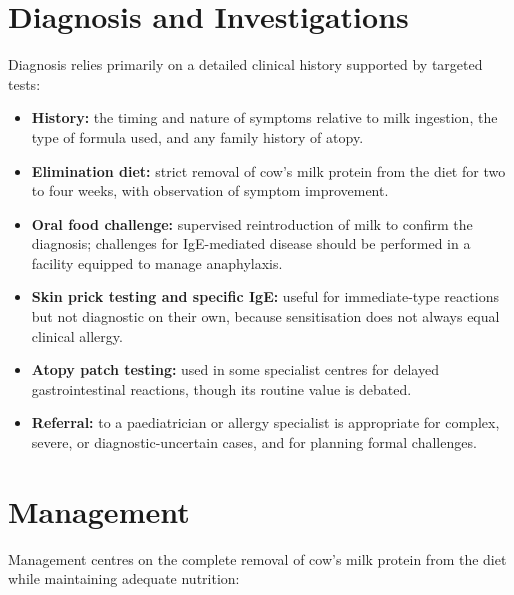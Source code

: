 \section*{Diagnosis and Investigations}
Diagnosis relies primarily on a detailed clinical history supported by targeted tests:

\begin{itemize}
    \item \textbf{History:} the timing and nature of symptoms relative to milk ingestion, the type of formula used, and any family history of atopy.
    \item \textbf{Elimination diet:} strict removal of cow's milk protein from the diet for two to four weeks, with observation of symptom improvement.
    \item \textbf{Oral food challenge:} supervised reintroduction of milk to confirm the diagnosis; challenges for IgE-mediated disease should be performed in a facility equipped to manage anaphylaxis.
    \item \textbf{Skin prick testing and specific IgE:} useful for immediate-type reactions but not diagnostic on their own, because sensitisation does not always equal clinical allergy.
    \item \textbf{Atopy patch testing:} used in some specialist centres for delayed gastrointestinal reactions, though its routine value is debated.
    \item \textbf{Referral:} to a paediatrician or allergy specialist is appropriate for complex, severe, or diagnostic-uncertain cases, and for planning formal challenges.
\end{itemize}

\section*{Management}
Management centres on the complete removal of cow's milk protein from the diet while maintaining adequate nutrition:


